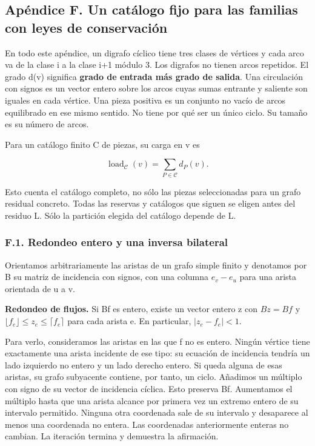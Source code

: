 \documentclass[spanish,11pt,a4paper]{article}
\begin{document}
\subsection{Apéndice F. Un catálogo fijo para las familias con leyes de conservación}\label{apuxe9ndice-f.-un-catuxe1logo-fijo-para-las-familias-con-leyes-de-conservaciuxf3n}

En todo este apéndice, un digrafo cíclico tiene tres clases de vértices y cada arco va de la clase i a la clase i+1 módulo 3. Los digrafos no tienen arcos repetidos. El grado d(v) significa \textbf{grado de entrada más grado de salida}. Una circulación con signos es un vector entero sobre los arcos cuyas sumas entrante y saliente son iguales en cada vértice. Una pieza positiva es un conjunto no vacío de arcos equilibrado en ese mismo sentido. No tiene por qué ser un único ciclo. Su tamaño es su número de arcos.

Para un catálogo finito C de piezas, su carga en v es

\[\operatorname{load}_{\mathcal C}(v)=\sum_{P\in\mathcal C}d_P(v).\]

Esto cuenta el catálogo completo, no sólo las piezas seleccionadas para un grafo residual concreto. Todas las reservas y catálogos que siguen se eligen antes del residuo L. Sólo la partición elegida del catálogo depende de L.

\subsubsection{F.1. Redondeo entero y una inversa bilateral}\label{f.1.-redondeo-entero-y-una-inversa-bilateral}

Orientamos arbitrariamente las aristas de un grafo simple finito y denotamos por B su matriz de incidencia con signos, con una columna \(e_{v}-e_{u}\) para una arista orientada de u a v.

\textbf{Redondeo de flujos.} Si Bf es entero, existe un vector entero z con \(Bz=Bf\) y \(\lfloor f_e\rfloor\le z_e\le\lceil f_e\rceil\) para cada arista e. En particular, \(|z_{e}-f_{e}|<1\).

Para verlo, consideramos las aristas en las que f no es entero. Ningún vértice tiene exactamente una arista incidente de ese tipo: su ecuación de incidencia tendría un lado izquierdo no entero y un lado derecho entero. Si queda alguna de esas aristas, su grafo subyacente contiene, por tanto, un ciclo. Añadimos un múltiplo con signo de su vector de incidencia cíclica. Esto preserva Bf. Aumentamos el múltiplo hasta que una arista alcance por primera vez un extremo entero de su intervalo permitido. Ninguna otra coordenada sale de su intervalo y desaparece al menos una coordenada no entera. Las coordenadas anteriormente enteras no cambian. La iteración termina y demuestra la afirmación.
\end{document}
